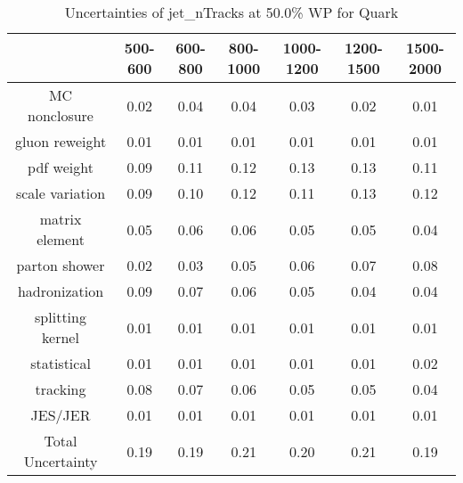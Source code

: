 \begin{table}
\centering
\caption{Uncertainties of jet_nTracks at 50.0\% WP for Quark}
\label{tab:syst_jet_nTracks_0.5_Quark}
\begin{tabular}{ccccccc}
\toprule
{} &  500-600 &  600-800 &  800-1000 &  1000-1200 &  1200-1500 &  1500-2000 \\
\midrule
MC nonclosure     &     0.02 &     0.04 &      0.04 &       0.03 &       0.02 &       0.01 \\
gluon reweight    &     0.01 &     0.01 &      0.01 &       0.01 &       0.01 &       0.01 \\
pdf weight        &     0.09 &     0.11 &      0.12 &       0.13 &       0.13 &       0.11 \\
scale variation   &     0.09 &     0.10 &      0.12 &       0.11 &       0.13 &       0.12 \\
matrix element    &     0.05 &     0.06 &      0.06 &       0.05 &       0.05 &       0.04 \\
parton shower     &     0.02 &     0.03 &      0.05 &       0.06 &       0.07 &       0.08 \\
hadronization     &     0.09 &     0.07 &      0.06 &       0.05 &       0.04 &       0.04 \\
splitting kernel  &     0.01 &     0.01 &      0.01 &       0.01 &       0.01 &       0.01 \\
statistical       &     0.01 &     0.01 &      0.01 &       0.01 &       0.01 &       0.02 \\
tracking          &     0.08 &     0.07 &      0.06 &       0.05 &       0.05 &       0.04 \\
JES/JER           &     0.01 &     0.01 &      0.01 &       0.01 &       0.01 &       0.01 \\
Total Uncertainty &     0.19 &     0.19 &      0.21 &       0.20 &       0.21 &       0.19 \\
\bottomrule
\end{tabular}
\end{table}
